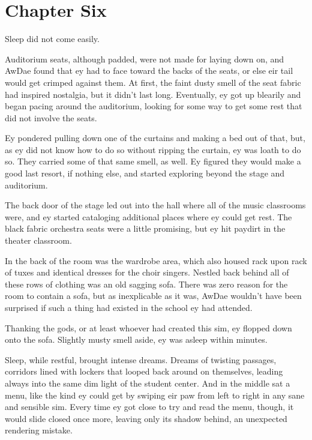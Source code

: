 \chapter*{Chapter Six}

Sleep did not come easily.

Auditorium seats, although padded, were not made for laying down on, and AwDae found that ey had to face toward the backs of the seats, or else eir tail would get crimped against them.  At first, the faint dusty smell of the seat fabric had inspired nostalgia, but it didn't last long.  Eventually, ey got up blearily and began pacing around the auditorium, looking for some way to get some rest that did not involve the seats.

Ey pondered pulling down one of the curtains and making a bed out of that, but, as ey did not know how to do so without ripping the curtain, ey was loath to do so.  They carried some of that same smell, as well.  Ey figured they would make a good last resort, if nothing else, and started exploring beyond the stage and auditorium.

The back door of the stage led out into the hall where all of the music classrooms were, and ey started cataloging additional places where ey could get rest.  The black fabric orchestra seats were a little promising, but ey hit paydirt in the theater classroom.

In the back of the room was the wardrobe area, which also housed rack upon rack of tuxes and identical dresses for the choir singers.  Nestled back behind all of these rows of clothing was an old sagging sofa.  There was zero reason for the room to contain a sofa, but as inexplicable as it was, AwDae wouldn't have been surprised if such a thing had existed in the school ey had attended.

Thanking the gods, or at least whoever had created this sim, ey flopped down onto the sofa.  Slightly musty smell aside, ey was asleep within minutes.

Sleep, while restful, brought intense dreams.  Dreams of twisting passages, corridors lined with lockers that looped back around on themselves, leading always into the same dim light of the student center.  And in the middle sat a menu, like the kind ey could get by swiping eir paw from left to right in any sane and sensible sim.  Every time ey got close to try and read the menu, though, it would slide closed once more, leaving only its shadow behind, an unexpected rendering mistake.

